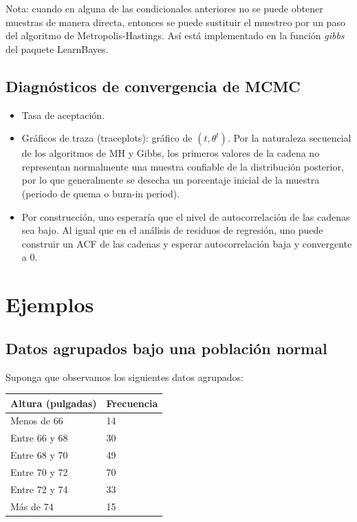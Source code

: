 \documentclass[
  12pt,
]{book}
\providecommand{\tightlist}{%
  \setlength{\itemsep}{0pt}\setlength{\parskip}{0pt}}
\begin{document}
Nota: cuando en alguna de las condicionales anteriores no se puede
obtener muestras de manera directa, entonces se puede sustituir el
muestreo por un paso del algoritmo de Metropolis-Hastings. Así está
implementado en la función \emph{gibbs} del paquete LearnBayes.

\hypertarget{diagnuxf3sticos-de-convergencia-de-mcmc}{%
\subsection{Diagnósticos de convergencia de
MCMC}\label{diagnuxf3sticos-de-convergencia-de-mcmc}}

\begin{itemize}
\tightlist
\item
  Tasa de aceptación.
\item
  Gráficos de traza (traceplots): gráfico de \((t,\theta^t)\). Por la
  naturaleza secuencial de los algoritmos de MH y Gibbs, los primeros
  valores de la cadena no representan normalmente una muestra confiable
  de la distribución posterior, por lo que generalmente se desecha un
  porcentaje inicial de la muestra (periodo de quema o burn-in period).
\item
  Por construcción, uno esperaría que el nivel de autocorrelación de las
  cadenas sea bajo. Al igual que en el análisis de residuos de
  regresión, uno puede construir un ACF de las cadenas y esperar
  autocorrelación baja y convergente a 0.
\end{itemize}

\hypertarget{ejemplos}{%
\section{Ejemplos}\label{ejemplos}}

\hypertarget{datos-agrupados-bajo-una-poblaciuxf3n-normal}{%
\subsection{Datos agrupados bajo una población
normal}\label{datos-agrupados-bajo-una-poblaciuxf3n-normal}}

Suponga que observamos los siguientes datos agrupados:

\begin{longtable}[]{@{}ll@{}}
\toprule()
Altura (pulgadas) & Frecuencia \\
\midrule()
\endhead
Menos de 66 & 14 \\
Entre 66 y 68 & 30 \\
Entre 68 y 70 & 49 \\
Entre 70 y 72 & 70 \\
Entre 72 y 74 & 33 \\
Más de 74 & 15 \\
\bottomrule()
\end{longtable}
\end{document}
